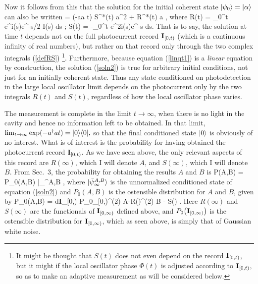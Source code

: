 \documentclass[12pt]{article}
\begin{document}
Now it follows from this that the solution for the initial coherent state
$| {\psi_0} \rangle=| {\alpha} \rangle$ can also be written 
\beq \label{soln2}
 = \exp(-\half a\dg a t) 
\exp \bl \half S^*(t) a^2  + R^*(t) a \br {},
\eeq
where
\beq
R(t) = \int_0^t e^{i\Phi(s)}e^{-s/2} I(s) ds \;;\;\;
S(t) = -\int_0^t e^{2i\Phi(s)}e^{-s} ds. \label{defRS}
\eeq
That is to say, the solution at time $t$ depends not on the full photocurrent
record ${\bf I}_{[0,t)}$ (which is a continuous infinity of real numbers), but
rather on that record only through the two complex integrals
(\ref{defRS}) \footnote{It might be thought that $S(t)$ does not even
depend on the record ${\bf I}_{[0,t)}$, but it might if the local oscillator phase $\Phi(t)$
is adjusted according to ${\bf I}_{[0,t)}$, so as to make an adaptive measurement as will be
considered below.}. Furthermore, because  equation (\ref{linqt1}) is a {\em linear}
equation by construction, the solution (\ref{soln2}) is true for arbitrary initial
conditions, not just for an initially coherent state. Thus any state conditioned on
photodetection in the large local oscillator limit depends on the photocurrent
only by the two integrals $R(t)$ and $S(t)$, regardless of how the local
oscillator phase varies. 

The measurement is complete in the limit $t\to\infty$, when there is no light in the
cavity and hence no information left to be obtained. In that limit,  $
\lim_{t\to \infty} \exp(-a^\dagger a t) = | {0} \rangle\langle {0} |, $
so that the final conditioned state $| {0} \rangle$ is obviously of no interest. What is
of interest is the probability for having obtained the photocurrent record ${\bf I}_{[0,t)}$.
As we have seen above, the only relevant aspects of this record are $R(\infty)$,
which I will denote $A$, and $S(\infty)$, which I will denote $B$. From
Sec.~3, the probability for obtaining the results $A$ and $B$ is 
\beq
P(A,B) = P_0(A,B) \langle \bar\psi_\infty^{A,B} ,
\eeq
where $| {\bar\psi_\infty^{A,B}} \rangle$ is the unnormalized conditioned state of
equation (\ref{soln2}) and $P_0(A,B)$ is the ostensible distribution for $A$ and $B$,
given by \beq \label{P0AB} P_0(A,B) = \int d{\bf I}_{[0,\infty)} P_0_{[0,\infty)}\br \delta^{(2)} \bl A-R(\infty)\br \delta^{(2)} \bl B -  S(\infty) \br.
\eeq
Here $R(\infty)$ and $S(\infty)$ are the functionals of ${\bf I}_{[0,\infty)}$
defined above, and $ P_0{\bigl(} {\bf I}_{[0,\infty)}{\bigr)}$ is the ostensible
distribution for ${\bf I}_{[0,\infty)}$, which as seen above, is simply that of
Gaussian white noise.
\end{document}
